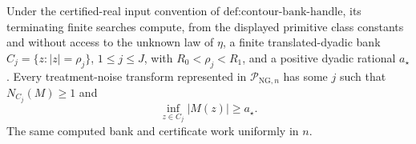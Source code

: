 Under the certified-real input convention of \(\text{def:contour-bank-handle}\), its terminating finite searches compute, from the displayed primitive class constants and without access to the unknown law of \(\eta\), a finite translated-dyadic bank \(C_j=\{z:|z|=\rho_j\}\), \(1\le j\le J\), with \(R_0<\rho_j<R_1\), and a positive dyadic rational \(a_{\star}\). Every treatment-noise transform represented in \(\mathcal P_{\mathrm{NG},n}\) has some \(j\) such that \(N_{C_j}(M)\ge1\) and
\[
 \inf_{z\in C_j}|M(z)|\ge a_{\star}.
\]
The same computed bank and certificate work uniformly in \(n\).